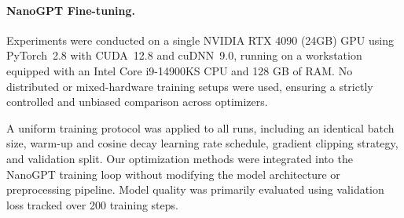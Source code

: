 \documentclass[a4paper,14pt,oneside]{extarticle}
\begin{document}
\paragraph{NanoGPT Fine-tuning.} Experiments were conducted on a single NVIDIA RTX 4090 (24GB) GPU using PyTorch~2.8 with CUDA~12.8 and cuDNN~9.0, running on a workstation equipped with an Intel Core i9-14900KS CPU and 128 GB of RAM. No distributed or mixed-hardware training setups were used, ensuring a strictly controlled and unbiased comparison across optimizers.

A uniform training protocol was applied to all runs, including an identical batch size, warm-up and cosine decay learning rate schedule, gradient clipping strategy, and validation split. Our optimization methods were integrated into the NanoGPT training loop without modifying the model architecture or preprocessing pipeline. Model quality was primarily evaluated using validation loss tracked over 200 training steps.
\end{document}
